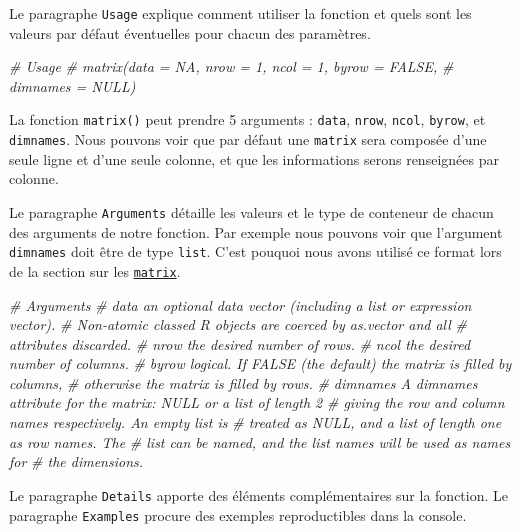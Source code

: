 \documentclass[]{book}
\newenvironment{Shaded}{\begin{snugshade}}{\end{snugshade}}
\newcommand{\CommentTok}[1]{\textcolor[rgb]{0.56,0.35,0.01}{\textit{#1}}}
\begin{document}
Le paragraphe \texttt{Usage} explique comment utiliser la fonction et quels sont les valeurs par défaut éventuelles pour chacun des paramètres.

\begin{Shaded}
\begin{Highlighting}[]
\CommentTok{# Usage}
\CommentTok{# matrix(data = NA, nrow = 1, ncol = 1, byrow = FALSE,}
\CommentTok{#        dimnames = NULL)}
\end{Highlighting}
\end{Shaded}

La fonction \texttt{matrix()} peut prendre 5 arguments : \texttt{data}, \texttt{nrow}, \texttt{ncol}, \texttt{byrow}, et \texttt{dimnames}. Nous pouvons voir que par défaut une \texttt{matrix} sera composée d'une seule ligne et d'une seule colonne, et que les informations serons renseignées par colonne.

Le paragraphe \texttt{Arguments} détaille les valeurs et le type de conteneur de chacun des arguments de notre fonction. Par exemple nous pouvons voir que l'argument \texttt{dimnames} doit être de type \texttt{list}. C'est pouquoi nous avons utilisé ce format lors de la section sur les \protect\hyperlink{l014matrix}{\texttt{matrix}}.

\begin{Shaded}
\begin{Highlighting}[]
\CommentTok{# Arguments}
\CommentTok{# data      an optional data vector (including a list or expression vector). }
\CommentTok{#           Non-atomic classed R objects are coerced by as.vector and all }
\CommentTok{#           attributes discarded.}
\CommentTok{# nrow      the desired number of rows.}
\CommentTok{# ncol      the desired number of columns.}
\CommentTok{# byrow     logical. If FALSE (the default) the matrix is filled by columns, }
\CommentTok{#           otherwise the matrix is filled by rows.}
\CommentTok{# dimnames  A dimnames attribute for the matrix: NULL or a list of length 2 }
\CommentTok{#           giving the row and column names respectively. An empty list is }
\CommentTok{#           treated as NULL, and a list of length one as row names. The }
\CommentTok{#           list can be named, and the list names will be used as names for }
\CommentTok{#           the dimensions.}
\end{Highlighting}
\end{Shaded}

Le paragraphe \texttt{Details} apporte des éléments complémentaires sur la fonction. Le paragraphe \texttt{Examples} procure des exemples reproductibles dans la console.
\end{document}
